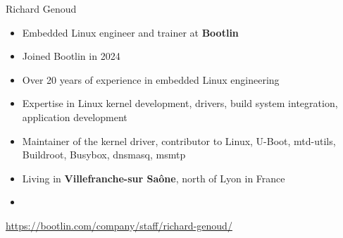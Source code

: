 \begin{frame}{Richard Genoud}
  \begin{itemize}
  \item Embedded Linux engineer and trainer at {\bf Bootlin}
  \item Joined Bootlin in 2024
  \item Over 20 years of experience in embedded Linux engineering
  \item Expertise in Linux kernel development, drivers, build system
    integration, application development
  \item Maintainer of the  kernel driver,
    contributor to Linux, U-Boot, mtd-utils, Buildroot, Busybox,
    dnsmasq, msmtp
  \item Living in {\bf Villefranche-sur Saône}, north of Lyon in France
  \item {}
  \end{itemize}
  {\small \url{https://bootlin.com/company/staff/richard-genoud/}}
\end{frame}

